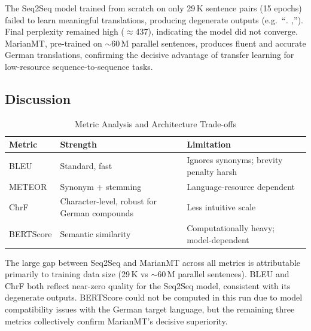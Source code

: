 The Seq2Seq model trained from scratch on only 29\,K sentence pairs (15 epochs)
failed to learn meaningful translations, producing degenerate outputs (e.g.\ ``\textit{. ,}'').
Final perplexity remained high ($\approx$437), indicating the model did not converge.
MarianMT, pre-trained on $\sim$60\,M parallel sentences, produces fluent and accurate
German translations, confirming the decisive advantage of transfer learning for low-resource
sequence-to-sequence tasks.

\subsection{Discussion}

\begin{table}[H]
  \centering
  \caption{Metric Analysis and Architecture Trade-offs}
  \label{tab:q4_discussion}
  \begin{tabular}{lp{5cm}p{5cm}}
    \toprule
    \textbf{Metric} & \textbf{Strength} & \textbf{Limitation} \\
    \midrule
    BLEU    & Standard, fast      & Ignores synonyms; brevity penalty harsh \\
    METEOR  & Synonym + stemming  & Language-resource dependent \\
    ChrF    & Character-level, robust for German compounds & Less intuitive scale \\
    BERTScore & Semantic similarity & Computationally heavy; model-dependent \\
    \bottomrule
  \end{tabular}
\end{table}

The large gap between Seq2Seq and MarianMT across all metrics is attributable
primarily to training data size (29\,K vs $\sim$60\,M parallel sentences).
BLEU and ChrF both reflect near-zero quality for the Seq2Seq model, consistent
with its degenerate outputs. BERTScore could not be computed in this run due to
model compatibility issues with the German target language, but the remaining
three metrics collectively confirm MarianMT's decisive superiority.
